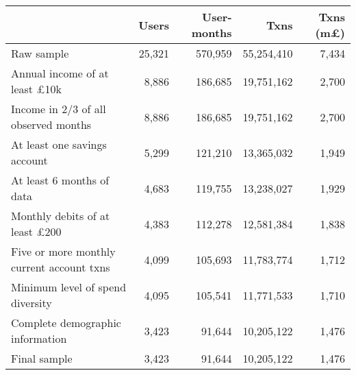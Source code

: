 \begin{tabular}{lrrrr}
\toprule
                                          &  Users & User-months &       Txns & Txns (m\pounds) \\
\midrule
                               Raw sample & 25,321 &     570,959 & 55,254,410 &           7,434 \\
     Annual income of at least \pounds10k &  8,886 &     186,685 & 19,751,162 &           2,700 \\
     Income in 2/3 of all observed months &  8,886 &     186,685 & 19,751,162 &           2,700 \\
             At least one savings account &  5,299 &     121,210 & 13,365,032 &           1,949 \\
                At least 6 months of data &  4,683 &     119,755 & 13,238,027 &           1,929 \\
    Monthly debits of at least \pounds200 &  4,383 &     112,278 & 12,581,384 &           1,838 \\
Five or more monthly current account txns &  4,099 &     105,693 & 11,783,774 &           1,712 \\
         Minimum level of spend diversity &  4,095 &     105,541 & 11,771,533 &           1,710 \\
         Complete demographic information &  3,423 &      91,644 & 10,205,122 &           1,476 \\
                             Final sample &  3,423 &      91,644 & 10,205,122 &           1,476 \\
\bottomrule
\end{tabular}
